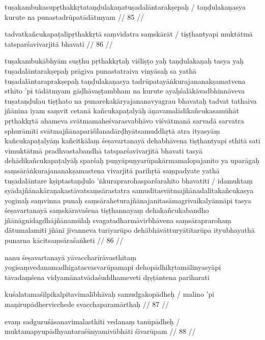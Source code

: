 tuṣakambukasupṛthakkṛtataṇḍulakaṇatuṣadalāntarakṣepaḥ  /
taṇḍulakaṇasya kurute na punastadrūpatādātmyam  // 85  //

tadvatkañcukapaṭalīpṛthakkṛtā saṃvidatra saṃskārāt  /
tiṣṭhantyapi muktātmā tatsparśavivarjitā bhavati  // 86  //

tuṣakambukābhyām suṣṭhu pṛthakkṛtaḥ viśliṣṭo yaḥ taṇḍulakaṇaḥ tasya yaḥ tuṣadalāntarakṣepaḥ prāgiva punastatraiva vinyāsaḥ sa yathā tuṣadalāntaraprakṣepaḥ taṇḍulakaṇasya tadrūpatayāṅkurajananakṣamatvena sthito 'pi tādātmyam gāḍhāvaṣṭambham na kurute ayaḥśalākāvadbhinnāveva tuṣataṇḍulau tiṣṭhato na punarekakāryajananavyagrau bhavataḥ tadvat tathaiva jñānina iyam saṃvit cetanā kañcukapaṭalyāḥ āṇavamalādikañcukasamūhāt pṛthakkṛtā ahameva svātmamaheśvarasvabhāvo viśvātmanā sarvadā sarvatra sphurāmīti svātmajñānapariśīlanadārḍhyātsamuddhṛtā atra ityasyāṃ kañcukapaṭalyāṃ kañcitkālaṃ śeṣavartanayā dehabhāvena tiṣṭhantyapi sthitā satī vimuktātmā pradhvastabandhā tatsparśavivarjitā bhavati tasyā dehādikañcukapaṭalyāḥ sparśaḥ puṇyāpuṇyarūpakārmamalopajanito ya uparāgaḥ saṃsārāṅkurajananakṣamastena vivarjitā parihṛtā saṃpadyate yathā tuṣadalāntare kṣiptastaṇḍulo 'ṅkuraprarohasparśarahito bhavatīti  / idamuktaṃ syādajñānakāraṇakastāvatsaṃsārastatra samuditasvātmajñānadalitakañcukasya yoginaḥ saṃvinna punaḥ saṃsāraheturajñānajanitasāmagrīvaikalyānnāpi tasya śeṣavartanayā saṃskāravaśena tiṣṭhannayaṃ dehakañcukabandho jñānāgnidagdhājñānamūlaḥ svagatadharmāvirbhāvena saṃsāraprarohaṃ dātumalamiti jñānī jīvanneva turīyarūpo dehābhāvātturyātītarūpa ityubhayathā punarna kācitsaṃsāraśaṅketi  // 86  //

nanu śeṣavartanayā yāvaccharīrāvasthitaṃ yogisaṃvedanamadhigatasvasvarūpamapi dehopādhikṛtamālinyasyāpi tāvadaṃśena vidyamānatvādaśuddhameveti dṛṣṭāntena pariharati

kuśalatamaśilpikalpitavimalībhāvaḥ samudgakopādheḥ  /
malino 'pi maṇirupādhervicchede svacchaparamārthaḥ  // 87  //

evaṃ sadguruśāsanavimalasthiti vedanaṃ tanūpādheḥ  /
muktamapyupādhyantaraśūnyamivābhāti śivarūpam  // 88  //

